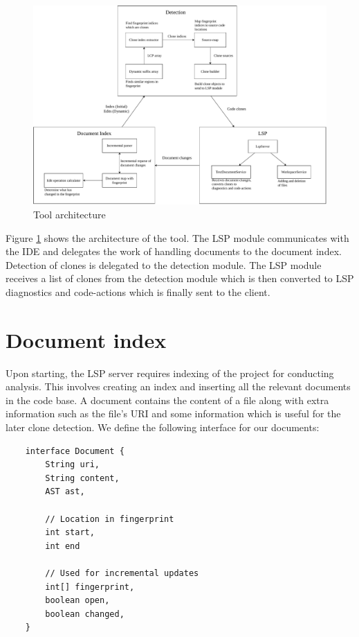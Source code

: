 \begin{figure}
	\includegraphics[width=\textwidth]{figures/architecture.drawio.pdf}
	\caption{Tool architecture}
	\label{fig:architecture}
\end{figure}

Figure \ref{fig:architecture} shows the architecture of the tool. The LSP module
communicates with the IDE and delegates the work of handling documents to the document
index. Detection of clones is delegated to the detection module. The LSP module receives a
list of clones from the detection module which is then converted to LSP diagnostics and
code-actions which is finally sent to the client.

\section{Document index}

Upon starting, the LSP server requires indexing of the project for conducting analysis.
This involves creating an index and inserting all the relevant documents in the code base.
A document contains the content of a file along with extra information such as the file's
URI and some information which is useful for the later clone detection. We define the
following interface for our documents:

\begin{lstlisting}
    interface Document {
        String uri,
        String content,
        AST ast,

        // Location in fingerprint
        int start,
        int end

        // Used for incremental updates
        int[] fingerprint,
        boolean open,
        boolean changed,
    }
\end{lstlisting}

